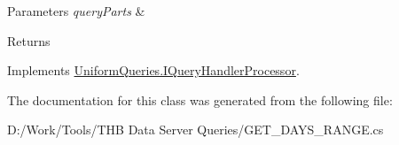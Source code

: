 \begin{DoxyParams}{Parameters}
{\em query\+Parts} & \\
\hline
\end{DoxyParams}
\begin{DoxyReturn}{Returns}

\end{DoxyReturn}


Implements \mbox{\hyperlink{interface_uniform_queries_1_1_i_query_handler_processor_a435493887db64defdb6019c3c418a4d4}{Uniform\+Queries.\+I\+Query\+Handler\+Processor}}.



The documentation for this class was generated from the following file\+:\begin{DoxyCompactItemize}
\item 
D\+:/\+Work/\+Tools/\+T\+H\+B Data Server Queries/G\+E\+T\+\_\+\+D\+A\+Y\+S\+\_\+\+R\+A\+N\+G\+E.\+cs\end{DoxyCompactItemize}
